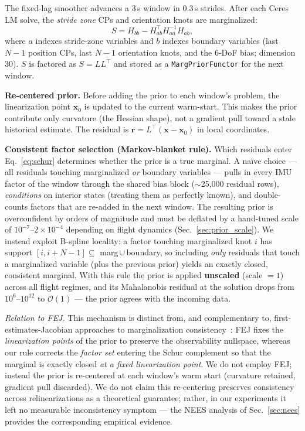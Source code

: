\documentclass[journal]{IEEEtran}
\begin{document}
The fixed-lag smoother advances a 3\,s window in 0.3\,s strides.
After each Ceres LM solve, the \emph{stride zone} CPs and orientation
knots are marginalized:
\begin{equation}
  S = H_{bb} - H_{ab}^{\top} H_{aa}^{-1} H_{ab},
  \label{eq:schur}
\end{equation}
where $a$ indexes stride-zone variables and $b$ indexes boundary
variables (last $N{-}1$ position CPs, last $N{-}1$ orientation
knots, and the 6-DoF bias; dimension 30).  $S$ is factored as
$S = LL^{\top}$ and stored as a \texttt{MargPriorFunctor} for the
next window.

\textbf{Re-centered prior.}
Before adding the prior to each window's problem, the linearization
point $\mathbf{x}_0$ is updated to the current warm-start.  This
makes the prior contribute only curvature (the Hessian shape), not a
gradient pull toward a stale historical estimate.  The residual is
$\mathbf{r} = L^{\top}(\mathbf{x} - \mathbf{x}_0)$ in local
coordinates.

\textbf{Consistent factor selection (Markov-blanket rule).}
Which residuals enter Eq.~\eqref{eq:schur} determines whether the
prior is a true marginal.  A na\"ive choice --- all residuals touching
marginalized \emph{or} boundary variables --- pulls in every IMU factor
of the window through the shared bias block ($\sim$25{,}000 residual
rows), \emph{conditions} on interior states (treating them as perfectly
known), and double-counts factors that are re-added in the next window.
The resulting prior is overconfident by orders of magnitude and must be
deflated by a hand-tuned scale of $10^{-7}$--$2{\times}10^{-4}$
depending on flight dynamics (Sec.~\ref{sec:prior_scale}).
We instead exploit B-spline locality: a factor touching marginalized
knot $i$ has support $[i, i{+}N{-}1] \subseteq$
marg\,$\cup$\,boundary, so including \emph{only} residuals that touch a
marginalized variable (plus the previous prior) yields an exactly
closed, consistent marginal.  With this rule the prior is applied
\textbf{unscaled} (scale $=1$) across all flight regimes, and its
Mahalanobis residual at the solution drops from $10^{6}$--$10^{12}$
to $\mathcal{O}(1)$ --- the prior agrees with the incoming data.

\emph{Relation to FEJ.}  This mechanism is distinct from, and
complementary to, first-estimates-Jacobian approaches to
marginalization consistency~\cite{dongsi2012consistency}: FEJ fixes
the \emph{linearization points} of the prior to preserve the
observability nullspace, whereas our rule corrects the
\emph{factor set} entering the Schur complement so that the marginal
is exactly closed \emph{at a fixed linearization point}.  We do not
employ FEJ; instead the prior is re-centered at each window's warm
start (curvature retained, gradient pull discarded).  We do not claim
this re-centering preserves consistency across relinearizations as a
theoretical guarantee; rather, in our experiments it left no measurable
inconsistency symptom --- the NEES analysis of
Sec.~\ref{sec:nees} provides the corresponding empirical evidence.
\end{document}

